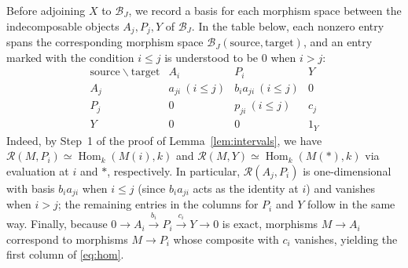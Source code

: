 \documentclass[a4paper,reqno,10pt]{amsart}
\numberwithin{equation}{section}
\theoremstyle{definition}
\newcommand{\B}{\mathcal B}
\newcommand{\Rcat}{\mathcal R}
\DeclareMathOperator{\Hom}{Hom}
\begin{document}
Before adjoining $X$ to $\B_J$, we record a basis for each morphism space
between the indecomposable objects $A_j,P_j,Y$ of $\B_J$. In the table below,
each nonzero entry spans the corresponding morphism space
$\B_J(\text{source},\text{target})$, and an entry marked with the condition
$i\le j$ is understood to be $0$ when $i>j$:
\begin{equation}\label{eq:hom}
\begin{array}{c|ccc}
 \text{source}\ \backslash\ \text{target}& A_i&P_i&Y\\ \hline
 A_j & a_{ji}\ (i\le j)& b_i a_{ji}\ (i\le j)&0\\
 P_j & 0 & p_{ji}\ (i\le j) & c_j\\
 Y   & 0 & 0 & 1_Y
\end{array}
\end{equation}
Indeed, by Step~1 of the proof of Lemma~\ref{lem:intervals}, we have
$\Rcat(M,P_i)\simeq\Hom_k(M(i),k)$ and $\Rcat(M,Y)\simeq\Hom_k(M(*),k)$ via
evaluation at $i$ and $*$, respectively. In particular, $\Rcat(A_j,P_i)$ is
one-dimensional with basis $b_i a_{ji}$ when $i\le j$ (since $b_i a_{ji}$ acts
as the identity at $i$) and vanishes when $i>j$; the remaining entries in the
columns for $P_i$ and $Y$ follow in the same way. Finally, because
$0\to A_i\xrightarrow{b_i}P_i\xrightarrow{c_i}Y\to0$ is exact, morphisms
$M\to A_i$ correspond to morphisms $M\to P_i$ whose composite with $c_i$
vanishes, yielding the first column of \eqref{eq:hom}.
\end{document}

